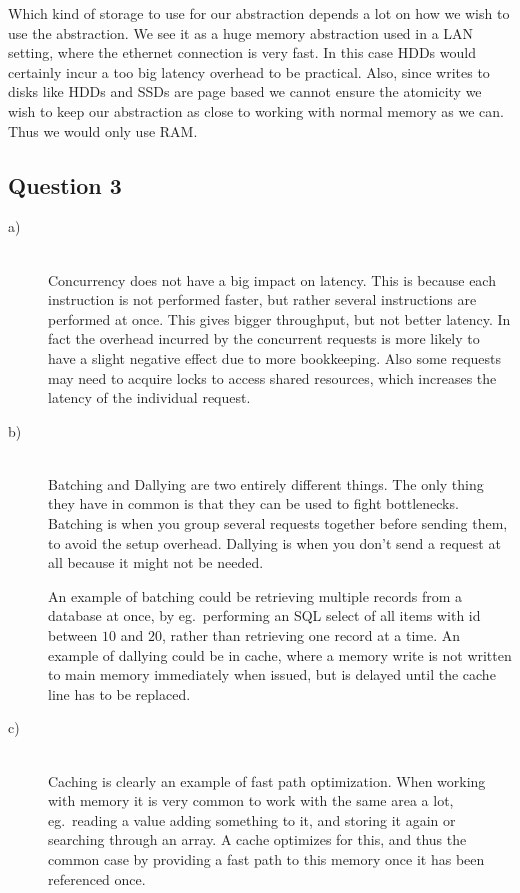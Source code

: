 \documentclass[a4paper,final]{article}
\begin{document}
Which kind of storage to use for our abstraction depends a lot on how we wish
to use the abstraction. We see it as a huge memory abstraction used in a LAN
setting, where the ethernet connection is very fast. In this case HDDs would
certainly incur a too big latency overhead to be practical. Also, since writes
to disks like HDDs and SSDs are page based we cannot ensure the atomicity we
wish to keep our abstraction as close to working with normal memory as we can.
Thus we would only use RAM.


\subsection*{Question 3}
\begin{description}
\item [a)]\ \\
Concurrency does not have a big impact on latency. This is because each
instruction is not performed faster, but rather several instructions are
performed at once. This gives bigger throughput, but not better latency. In
fact the overhead incurred by the concurrent requests is more likely to have
a slight negative effect due to more bookkeeping. Also some requests may need
to acquire locks to access shared resources, which increases the latency of
the individual request.

\item [b)]\ \\
Batching and Dallying are two entirely different things. The only thing they
have in common is that they can be used to fight bottlenecks. Batching is when
you group several requests together before sending them, to avoid the setup
overhead. Dallying is when you don't send a request at all because it might
not be needed.

An example of batching could be retrieving multiple records from a database
at once, by eg.~performing an SQL select of all items with id between $10$ and
$20$, rather than retrieving one record at a time.
An example of dallying could be in cache, where a memory write is not written
to main memory immediately when issued, but is delayed until the cache line
has to be replaced.
\item [c)]\ \\
Caching is clearly an example of fast path optimization. When working with
memory it is very common to work with the same area a lot, eg.~reading a value
adding something to it, and storing it again or searching through an array.
A cache optimizes for this, and thus the common case by providing a fast path
to this memory once it has been referenced once.
\end{description}
\end{document}
